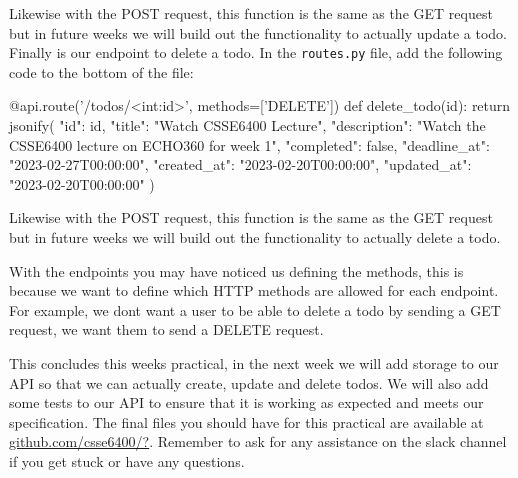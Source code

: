 \documentclass{csse4400}
\begin{document}
Likewise with the POST request, this function is the same as the GET request but in future weeks we will build out the functionality to actually update a todo. Finally is our endpoint to delete a todo. In the \texttt{routes.py} file, add the following code to the bottom of the file:

\begin{code}[language=python]{}
@api.route('/todos/<int:id>', methods=['DELETE'])
def delete_todo(id):
    return jsonify({
      "id": id,
      "title": "Watch CSSE6400 Lecture",
      "description": "Watch the CSSE6400 lecture on ECHO360 for week 1",
      "completed": false,
      "deadline_at": "2023-02-27T00:00:00",
      "created_at": "2023-02-20T00:00:00",
      "updated_at": "2023-02-20T00:00:00"
    })
\end{code}

Likewise with the POST request, this function is the same as the GET request but in future weeks we will build out the functionality to actually delete a todo.

With the endpoints you may have noticed us defining the methods, this is because we want to define which HTTP methods are allowed for each endpoint. For example, we dont want a user to be able to delete a todo by sending a GET request, we want them to send a DELETE request.

This concludes this weeks practical, in the next week we will add storage to our API so that we can actually create, update and delete todos. We will also add some tests to our API to ensure that it is working as expected and meets our specification. The final files you should have for this practical are available at \url{github.com/csse6400/?}. Remember to ask for any assistance on the slack channel if you get stuck or have any questions.



\end{document}
